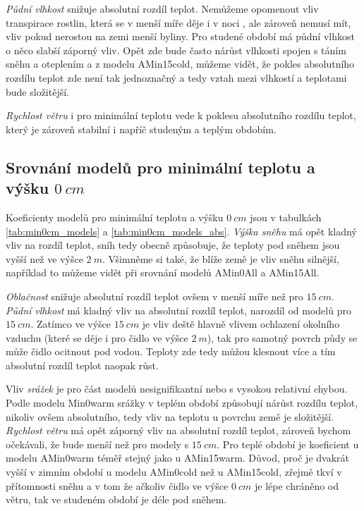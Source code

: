 \textit{Půdní vlhkost} snižuje absolutní rozdíl teplot. Nemůžeme opomenout vliv transpirace rostlin, která se v menší míře děje i v noci \parencite{nighttranspiration}, ale zároveň nemusí mít, vliv pokud nerostou na zemi menší byliny. Pro studené období má půdní vlhkost o něco slabší záporný vliv. Opět zde bude často nárůst vlhkosti spojen s táním sněhu a oteplením a z modelu AMin15cold, můžeme vidět, že pokles absolutního rozdílu teplot zde není tak jednoznačný a tedy vztah mezi vlhkostí a teplotami bude složitější.

\textit{Rychlost větru} i pro minimální teplotu vede k poklesu absolutního rozdílu teplot, který je zároveň stabilní i napříč studeným a teplým obdobím.

\subsection{Srovnání modelů pro minimální teplotu a výšku $\SI{0}{cm}$}
Koeficienty modelů pro minimální teplotu a výšku $\SI{0}{cm}$ jsou v tabulkách \ref{tab:min0cm_models} a \ref{tab:min0cm_models_abs}. \textit{Výška sněhu} má opět kladný vliv na rozdíl teplot, sníh tedy obecně způsobuje, že teploty pod sněhem jsou vyšší než ve výšce $\SI{2}{m}$. Všimněme si také, že blíže země je vliv sněhu silnější, například to můžeme vidět při srovnání modelů AMin0All a AMin15All.

\textit{Oblačnost} snižuje absolutní rozdíl teplot ovšem v menší míře než pro $\SI{15}{cm}$. \textit{Půdní vlhkost} má kladný vliv na absolutní rozdíl teplot, narozdíl od modelů pro $\SI{15}{cm}$. Zatímco ve výšce $\SI{15}{cm}$ je vliv deště hlavně vlivem ochlazení okolního vzduchu (které se děje i pro čidlo ve výšce $\SI{2}{m}$), tak pro samotný povrch půdy se může čidlo ocitnout pod vodou. Teploty zde tedy můžou klesnout více a tím absolutní rozdíl teplot naopak růst.

Vliv \textit{srážek} je pro část modelů nesignifikantní nebo s vysokou relativní chybou. Podle modelu Min0warm srážky v teplém období způsobují nárůst rozdílu teplot, nikoliv ovšem absolutního, tedy vliv na teplotu u povrchu země je složitější. \textit{Rychlost větru} má opět záporný vliv na absolutní rozdíl teplot, zároveň bychom očekávali, že bude menší než pro modely s $\SI{15}{cm}$. Pro teplé období je koeficient u modelu AMin0warm téměř stejný jako u AMin15warm. Důvod, proč je dvakrát vyšší v zimním období u modelu AMin0cold než u AMin15cold, zřejmě tkví v přítomnosti sněhu a v tom že ačkoliv čidlo ve výšce $\SI{0}{cm}$ je lépe chráněno od větru, tak ve studeném období je déle pod sněhem. 

